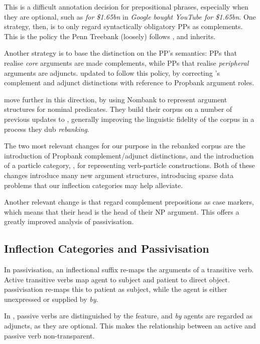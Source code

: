 \documentclass[11pt]{article}
\begin{document}
This is a difficult annotation decision for prepositional phrases, especially
when they are optional, such as \emph{for \$1.65bn} in \emph{Google bought YouTube
for \$1.65bn}. One strategy, then, is to only regard syntactically obligatory
PPs as complements. This is the policy the Penn Treebank (loosely) follows
\citep{bies:95}, and \ccgbank inherits.

Another strategy is to base the distinction on the PP's semantics:
PPs that realise \emph{core} arguments are made complements, while PPs that
realise \emph{peripheral} arguments are adjuncts.
\citet{honnibal:pacling07prop} updated \ccgbank to follow this policy, by
correcting \ccgbank's complement and adjunct distinctions with reference to
Propbank \citep{propbank} argument roles.

\citet{honnibal:10} move further in this direction, by using Nombank
\citep{nombank} to represent argument structures for nominal predicates.
They build their corpus on a number of previous updates to \ccgbank, generally
improving the linguistic fidelity of the corpus in a process they dub
\emph{rebanking}.

The two most relevant changes for our purpose in the rebanked corpus
are the introduction of Propbank complement/adjunct distinctions, and the
introduction of a particle category, , for representing verb-particle
constructions. Both of these changes introduce many new argument structures,
introducing sparse data problems that our inflection categories may help
alleviate.

Another relevant change is that \citeauthor{honnibal:10} regard
complement prepositions as case markers, which means that their head
is the head of their NP argument. This offers a greatly improved
analysis of passivisation.

\subsection{Inflection Categories and Passivisation}

In passivisation, an inflectional suffix re-maps the arguments of a transitive
verb. Active transitive verbs map agent to subject and patient to direct object.
passivisation re-maps this to patient as subject, while the agent is either
unexpressed or supplied by \emph{by}.

In \ccgbank, passive verbs are distinguished by the  feature, and
\emph{by} agents are regarded as adjuncts, as they are optional. This makes
the relationship between an active and passive verb non-transparent.
\end{document}
